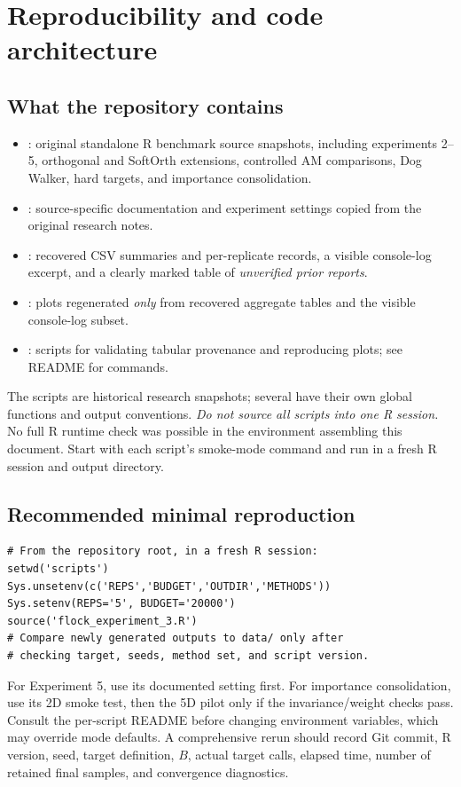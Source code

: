 \documentclass[11pt,letterpaper]{article}
\begin{document}
\section{Reproducibility and code architecture}
\subsection{What the repository contains}
\begin{itemize}
\item \protect{}: original standalone R benchmark source snapshots, including experiments 2--5, orthogonal and SoftOrth extensions, controlled AM comparisons, Dog Walker, hard targets, and importance consolidation.
\item \protect{}: source-specific documentation and experiment settings copied from the original research notes.
\item \protect{}: recovered CSV summaries and per-replicate records, a visible console-log excerpt, and a clearly marked table of \emph{unverified prior reports}.
\item \protect{}: plots regenerated \emph{only} from recovered aggregate tables and the visible console-log subset.
\item \protect{}: scripts for validating tabular provenance and reproducing plots; see README for commands.
\end{itemize}
The scripts are historical research snapshots; several have their own global functions and output conventions. \emph{Do not source all scripts into one R session.} No full R runtime check was possible in the environment assembling this document. Start with each script's smoke-mode command and run in a fresh R session and output directory.

\subsection{Recommended minimal reproduction}
\begin{lstlisting}
# From the repository root, in a fresh R session:
setwd('scripts')
Sys.unsetenv(c('REPS','BUDGET','OUTDIR','METHODS'))
Sys.setenv(REPS='5', BUDGET='20000')
source('flock_experiment_3.R')
# Compare newly generated outputs to data/ only after
# checking target, seeds, method set, and script version.
\end{lstlisting}
For Experiment 5, use its documented \protect{} setting first. For importance consolidation, use its 2D smoke test, then the 5D pilot only if the invariance/weight checks pass. Consult the per-script README before changing environment variables, which may override mode defaults. A comprehensive rerun should record Git commit, R version, seed, target definition, \(B\), actual target calls, elapsed time, number of retained final samples, and convergence diagnostics.
\end{document}
